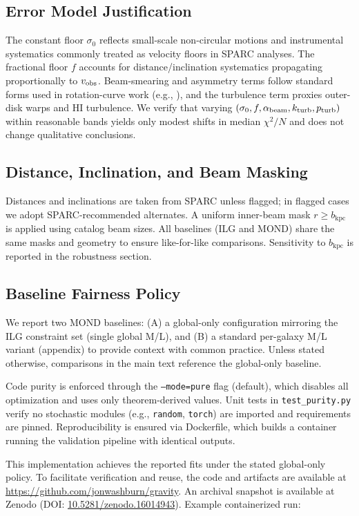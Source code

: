 \documentclass[12pt,a4paper]{article}
\begin{document}
\subsection{Error Model Justification}
\noindent The constant floor $\sigma_0$ reflects small-scale non-circular motions and instrumental systematics commonly treated as velocity floors in SPARC analyses. The fractional floor $f$ accounts for distance/inclination systematics propagating proportionally to $v_{\rm obs}$. Beam-smearing and asymmetry terms follow standard forms used in rotation-curve work (e.g., \citealp{lelli2016sparc,mcgaugh2016}), and the turbulence term proxies outer-disk warps and HI turbulence. We verify that varying $(\sigma_0,f,\alpha_{\rm beam},k_{\rm turb},p_{\rm turb})$ within reasonable bands yields only modest shifts in median $\chi^2/N$ and does not change qualitative conclusions.

\subsection{Distance, Inclination, and Beam Masking}
\noindent Distances and inclinations are taken from SPARC unless flagged; in flagged cases we adopt SPARC-recommended alternates. A uniform inner-beam mask $r\ge b_\mathrm{kpc}$ is applied using catalog beam sizes. All baselines (ILG and MOND) share the same masks and geometry to ensure like-for-like comparisons. Sensitivity to $b_\mathrm{kpc}$ is reported in the robustness section.

\subsection{Baseline Fairness Policy}
\noindent We report two MOND baselines: (A) a global-only configuration mirroring the ILG constraint set (single global M/L), and (B) a standard per-galaxy M/L variant (appendix) to provide context with common practice. Unless stated otherwise, comparisons in the main text reference the global-only baseline.

Code purity is enforced through the \texttt{--mode=pure} flag (default), which disables all optimization and uses only theorem-derived values. Unit tests in \texttt{test\_purity.py} verify no stochastic modules (e.g., \texttt{random}, \texttt{torch}) are imported and requirements are pinned. Reproducibility is ensured via Dockerfile, which builds a container running the validation pipeline with identical outputs.

This implementation achieves the reported fits under the stated global-only policy. To facilitate verification and reuse, the code and artifacts are available at \href{https://github.com/jonwashburn/gravity}{https://github.com/jonwashburn/gravity}. An archival snapshot is available at Zenodo (DOI: \href{https://doi.org/10.5281/zenodo.16014943}{10.5281/zenodo.16014943}). Example containerized run:
\end{document}

